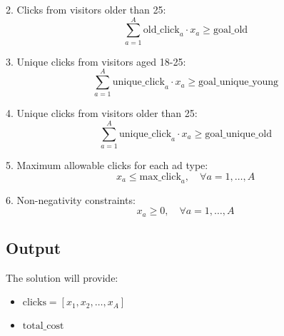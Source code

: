 \documentclass{article}
\begin{document}
2. Clicks from visitors older than 25:
\[
\sum_{a=1}^{A} \text{old\_click}_{a} \cdot x_a \geq \text{goal\_old}
\]

3. Unique clicks from visitors aged 18-25:
\[
\sum_{a=1}^{A} \text{unique\_click}_{a} \cdot x_a \geq \text{goal\_unique\_young}
\]

4. Unique clicks from visitors older than 25:
\[
\sum_{a=1}^{A} \text{unique\_click}_{a} \cdot x_a \geq \text{goal\_unique\_old}
\]

5. Maximum allowable clicks for each ad type:
\[
x_a \leq \text{max\_click}_{a}, \quad \forall a = 1, \ldots, A
\]

6. Non-negativity constraints:
\[
x_a \geq 0, \quad \forall a = 1, \ldots, A
\]

\subsection*{Output}
The solution will provide:
\begin{itemize}
    \item \( \text{clicks} = [x_{1}, x_{2}, \ldots, x_{A}] \)
    \item \( \text{total\_cost} \)
\end{itemize}
\end{document}
